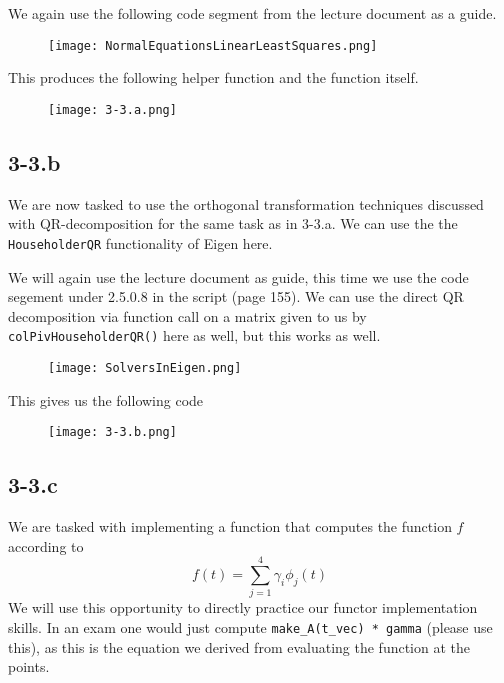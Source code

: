 \documentclass{article}
\begin{document}
\pagebreak

\noindent We again use the following code segment from the lecture document as a guide.

\begin{figure}[!hbt]
    \centering
\texttt{[image: NormalEquationsLinearLeastSquares.png]}
\end{figure}
\noindent This produces the following helper function and the function itself.

\begin{figure}[!hbt]
    \centering
\texttt{[image: 3-3.a.png]}
\end{figure}

\subsection*{3-3.b}
We are now tasked to use the orthogonal transformation techniques discussed with QR-decomposition for the same task as in 3-3.a. We can use the the \verb|HouseholderQR| functionality of Eigen here.

\pagebreak

\noindent We will again use the lecture document as guide, this time we use the code segement under 2.5.0.8 in the script (page 155). We can use the direct QR decomposition via function call on a matrix given to us by \verb|colPivHouseholderQR()| here as well, but this works as well.
\begin{figure}[!hbt]
    \centering
\texttt{[image: SolversInEigen.png]}
\end{figure}

\noindent This gives us the following code
\begin{figure}[!hbt]
    \centering
\texttt{[image: 3-3.b.png]}
\end{figure}

\subsection*{3-3.c}
We are tasked with implementing a function that computes the function $f$ according to
\begin{equation*}
    f\left(t\right) = \sum_{j=1}^{4}\gamma_{i}\phi_{j}\left(t\right)
\end{equation*}
We will use this opportunity to directly practice our functor implementation skills. In an exam one would just compute \verb|make_A(t_vec) * gamma| (please use this), as this is the equation we derived from evaluating the function at the points. 
\end{document}
